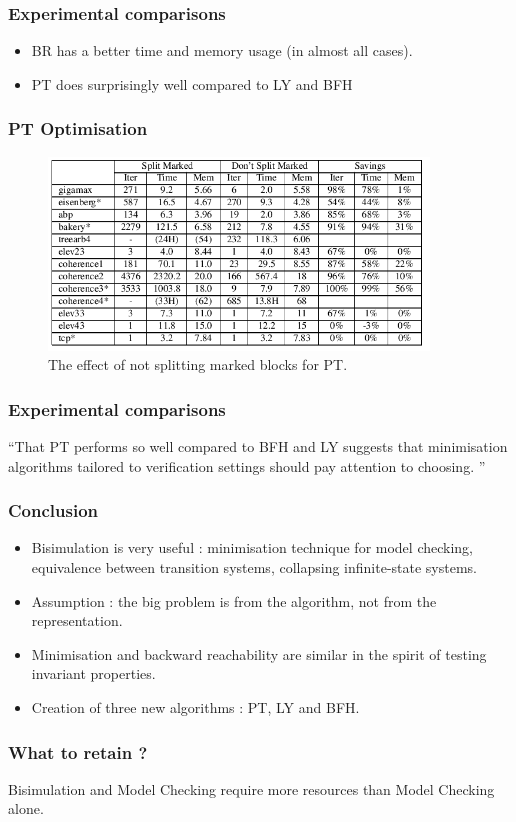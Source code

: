 \documentclass[11pt,handout]{beamer}
\begin{document}
\begin{frame}
  \frametitle{Experimental comparisons}
  \begin{itemize}
  \item BR has a better time and memory usage (in almost all cases).
  \item PT does surprisingly well compared to LY and BFH
  \end{itemize}
\end{frame}

\begin{frame}[fragile]
  \frametitle{PT Optimisation}
  \begin{figure}[t]
    \centering
    \includegraphics[width=0.9\textwidth]{figures/pt_table}
    \caption{The effect of not splitting marked blocks for PT.}
    \label{fig:experimental-comparison}
  \end{figure}
\end{frame}

\begin{frame}
  \frametitle{Experimental comparisons}
  ``That PT performs so well compared to BFH and LY suggests that minimisation
  algorithms tailored to verification settings should pay attention to choosing. ''
\end{frame}

\begin{frame}
  \frametitle{Conclusion}
  \begin{itemize}
  \item Bisimulation is very useful : minimisation technique for model checking,
    equivalence between transition systems, collapsing infinite-state systems.
  \item Assumption : the big problem is from the algorithm, not from the
    representation.
  \item Minimisation and backward reachability are similar in the spirit of
    testing invariant properties.
  \item Creation of three new algorithms : PT, LY and BFH.
  \end{itemize}
\end{frame}

\begin{frame}
  \frametitle{What to retain ?}
  Bisimulation and Model Checking require more resources than Model Checking
  alone.
\end{frame}
\end{document}
